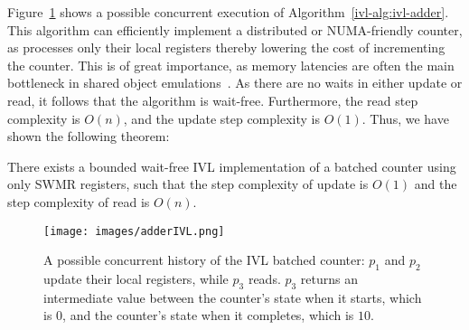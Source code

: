 Figure~\ref{ivl-img:adderIVL} shows a possible concurrent execution of Algorithm~\ref{ivl-alg:ivl-adder}.
This algorithm can efficiently implement a distributed or NUMA-friendly counter, as processes
only  their local registers thereby lowering the cost of incrementing the counter. This is of
great importance, as memory latencies are often the main bottleneck in shared object emulations~\cite{mahapatra1999processor}.
As there are no waits in
either {\sc update} or {\sc read}, it follows that the algorithm is wait-free. Furthermore, the {\sc read} step complexity
is $O(n)$, and the {\sc update} step complexity is $O(1)$. Thus, we have shown the following theorem:
\begin{theorem}
    There exists a bounded wait-free IVL implementation of a batched counter using only SWMR registers, such that the step complexity of {\sc update} is $O(1)$
    and the step complexity of {\sc read} is $O(n)$.
\end{theorem}

\begin{figure}[b]
    \centering
    \texttt{[image: images/adderIVL.png]}
    \caption{A possible concurrent history of the IVL batched counter: $p_1$ and
    $p_2$ update their local registers, while $p_3$ reads. $p_3$ returns an intermediate
    value between the counter's state when it starts, which is $0$, and the counter's state when it completes, which is $10$.}
    \label{ivl-img:adderIVL}
\end{figure}
